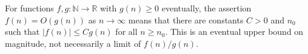 
For functions $f,g:\mathbb N\to\mathbb R$ with $g(n)\ge0$ eventually, the assertion $f(n)=O(g(n))$ as $n\to\infty$ means that there are constants $C>0$ and $n_0$ such that $|f(n)|\le Cg(n)$ for all $n\ge n_0$. This is an eventual upper bound on magnitude, not necessarily a limit of $f(n)/g(n)$.
